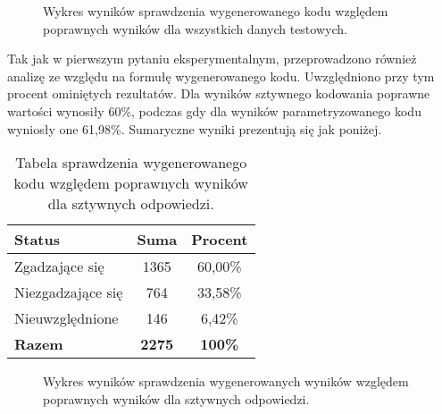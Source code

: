 \begin{figure}[H]
\centering
{}
\caption{Wykres wyników sprawdzenia wygenerowanego kodu względem poprawnych wyników dla wszystkich danych testowych.}\label{rys:plama2d}
\end{figure}

Tak jak w pierwszym pytaniu eksperymentalnym, przeprowadzono również analizę ze względu na formułę wygenerowanego kodu. Uwzględniono przy tym procent ominiętych rezultatów. Dla wyników sztywnego kodowania poprawne wartości wynosiły 60\%, podczas gdy dla wyników parametryzowanego kodu wyniosły one 61,98\%. Sumaryczne wyniki prezentują się jak poniżej.

\begin{table}[ht]
\caption{Tabela sprawdzenia wygenerowanego kodu względem poprawnych wyników dla sztywnych odpowiedzi.}\label{tab:tabela5}
\centering%
\begin{tabular}{|l|c|c|}
\hline
\textbf{Status} & \textbf{Suma} & \textbf{Procent} \\
\hline
Zgadzające się & 1365 & 60,00\% \\
\hline
Niezgadzające się & 764 & 33,58\% \\
\hline
Nieuwzględnione & 146 & 6,42\% \\
\hline
\textbf{Razem} & \textbf{2275} & \textbf{100\%} \\
\hline
\end{tabular}
\end{table}

\begin{figure}[H]
\centering
{}
\caption{Wykres wyników sprawdzenia wygenerowanych wyników względem poprawnych wyników dla sztywnych odpowiedzi.}\label{rys:plama2e}
\end{figure}

